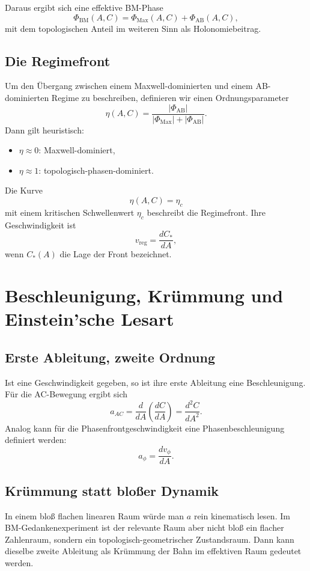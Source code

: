 \documentclass[11pt,a4paper]{article}
\theoremstyle{definition}
\theoremstyle{plain}
\begin{document}
	Daraus ergibt sich eine effektive BM-Phase
	\[
	\Phi_{\mathrm{BM}}(A,C)
	=
	\Phi_{\mathrm{Max}}(A,C)+\Phi_{\mathrm{AB}}(A,C),
	\]
	mit dem topologischen Anteil im weiteren Sinn als Holonomiebeitrag.
	
	\subsection{Die Regimefront}
	
	Um den Übergang zwischen einem Maxwell-dominierten und einem AB-dominierten Regime zu beschreiben, definieren wir einen Ordnungsparameter
	\[
	\eta(A,C)=\frac{|\Phi_{\mathrm{AB}}|}{|\Phi_{\mathrm{Max}}|+|\Phi_{\mathrm{AB}}|}.
	\]
	Dann gilt heuristisch:
	\begin{itemize}[leftmargin=2em]
		\item $\eta\approx 0$: Maxwell-dominiert,
		\item $\eta\approx 1$: topologisch-phasen-dominiert.
	\end{itemize}
	
	Die Kurve
	\[
	\eta(A,C)=\eta_c
	\]
	mit einem kritischen Schwellenwert $\eta_c$ beschreibt die Regimefront. Ihre Geschwindigkeit ist
	\[
	v_{\mathrm{reg}} = \frac{dC_*}{dA},
	\]
	wenn $C_*(A)$ die Lage der Front bezeichnet.
	
	\section{Beschleunigung, Krümmung und Einstein’sche Lesart}
	
	\subsection{Erste Ableitung, zweite Ordnung}
	
	Ist eine Geschwindigkeit gegeben, so ist ihre erste Ableitung eine Beschleunigung. Für die AC-Bewegung ergibt sich
	\[
	a_{AC} = \frac{d}{dA}\left(\frac{dC}{dA}\right) = \frac{d^2 C}{dA^2}.
	\]
	Analog kann für die Phasenfrontgeschwindigkeit eine Phasenbeschleunigung definiert werden:
	\[
	a_\phi = \frac{dv_\phi}{dA}.
	\]
	
	\subsection{Krümmung statt bloßer Dynamik}
	
	In einem bloß flachen linearen Raum würde man $a$ rein kinematisch lesen. Im BM-Gedankenexperiment ist der relevante Raum aber nicht bloß ein flacher Zahlenraum, sondern ein topologisch-geometrischer Zustandsraum. Dann kann dieselbe zweite Ableitung als Krümmung der Bahn im effektiven Raum gedeutet werden.
	
\end{document}
